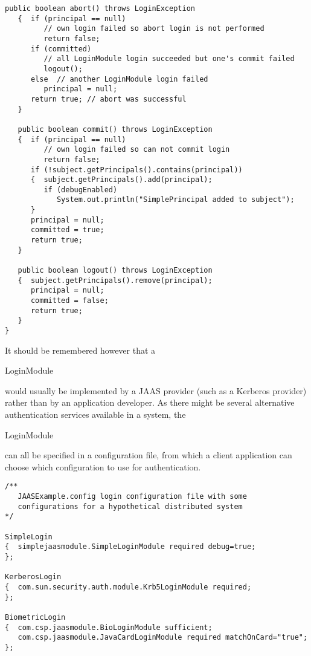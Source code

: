 \begin{lstlisting}[caption=JAAS Login]
   public boolean abort() throws LoginException
   {  if (principal == null)
         // own login failed so abort login is not performed
         return false;
      if (committed)
         // all LoginModule login succeeded but one's commit failed
         logout();
      else  // another LoginModule login failed
         principal = null;
      return true; // abort was successful
   }

   public boolean commit() throws LoginException
   {  if (principal == null)
         // own login failed so can not commit login
         return false;
      if (!subject.getPrincipals().contains(principal))
      {  subject.getPrincipals().add(principal);
         if (debugEnabled)
            System.out.println("SimplePrincipal added to subject");
      }
      principal = null;
      committed = true;
      return true;
   }

   public boolean logout() throws LoginException
   {  subject.getPrincipals().remove(principal);
      principal = null;
      committed = false;
      return true;
   }
}
\end{lstlisting}
It should be remembered however that a \begin{code}LoginModule\end{code}
would usually be implemented by a JAAS provider (such as a Kerberos provider)
rather than by an application developer.
As there might be several alternative authentication services available in a system,
the \begin{code}LoginModule\end{code} can all be specified in a configuration file,
from which a client application can choose which configuration to use
for authentication.

\begin{program}\begin{verbatim}
/**
   JAASExample.config login configuration file with some
   configurations for a hypothetical distributed system
*/

SimpleLogin
{  simplejaasmodule.SimpleLoginModule required debug=true;
};

KerberosLogin
{  com.sun.security.auth.module.Krb5LoginModule required;
};

BiometricLogin
{  com.csp.jaasmodule.BioLoginModule sufficient;
   com.csp.jaasmodule.JavaCardLoginModule required matchOnCard="true";
};
\end{verbatim}\end{program}

